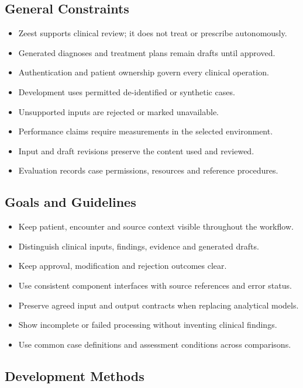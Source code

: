 \subsection{General Constraints}

\begin{itemize}
\item Zeest supports clinical review; it does not treat or prescribe autonomously.
\item Generated diagnoses and treatment plans remain drafts until approved.
\item Authentication and patient ownership govern every clinical operation.
\item Development uses permitted de-identified or synthetic cases.
\item Unsupported inputs are rejected or marked unavailable.
\item Performance claims require measurements in the selected environment.
\item Input and draft revisions preserve the content used and reviewed.
\item Evaluation records case permissions, resources and reference procedures.
\end{itemize}

\subsection{Goals and Guidelines}

\begin{itemize}
\item Keep patient, encounter and source context visible throughout the workflow.
\item Distinguish clinical inputs, findings, evidence and generated drafts.
\item Keep approval, modification and rejection outcomes clear.
\item Use consistent component interfaces with source references and error status.
\item Preserve agreed input and output contracts when replacing analytical models.
\item Show incomplete or failed processing without inventing clinical findings.
\item Use common case definitions and assessment conditions across comparisons.
\end{itemize}

\subsection{ Development Methods}

